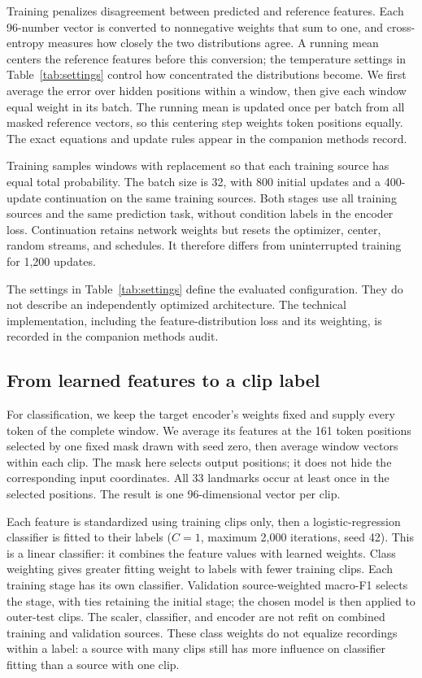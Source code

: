 \documentclass[10pt,twocolumn,letterpaper]{article}
\begin{document}
Training penalizes disagreement between predicted and reference features. Each 96-number vector is converted to nonnegative weights that sum to one, and cross-entropy measures how closely the two distributions agree. A running mean centers the reference features before this conversion; the temperature settings in Table~\ref{tab:settings} control how concentrated the distributions become. We first average the error over hidden positions within a window, then give each window equal weight in its batch. The running mean is updated once per batch from all masked reference vectors, so this centering step weights token positions equally. The exact equations and update rules appear in the companion methods record.

Training samples windows with replacement so that each training source has equal total probability. The batch size is 32, with 800 initial updates and a 400-update continuation on the same training sources. Both stages use all training sources and the same prediction task, without condition labels in the encoder loss. Continuation retains network weights but resets the optimizer, center, random streams, and schedules. It therefore differs from uninterrupted training for 1,200 updates.

The settings in Table~\ref{tab:settings} define the evaluated configuration. They do not describe an independently optimized architecture. The technical implementation, including the feature-distribution loss and its weighting, is recorded in the companion methods audit.

\subsection{From learned features to a clip label}
For classification, we keep the target encoder's weights fixed and supply every token of the complete window. We average its features at the 161 token positions selected by one fixed mask drawn with seed zero, then average window vectors within each clip. The mask here selects output positions; it does not hide the corresponding input coordinates. All 33 landmarks occur at least once in the selected positions. The result is one 96-dimensional vector per clip.

Each feature is standardized using training clips only, then a logistic-regression classifier is fitted to their labels ($C=1$, maximum 2,000 iterations, seed 42). This is a linear classifier: it combines the feature values with learned weights. Class weighting gives greater fitting weight to labels with fewer training clips. Each training stage has its own classifier. Validation source-weighted macro-F1 selects the stage, with ties retaining the initial stage; the chosen model is then applied to outer-test clips. The scaler, classifier, and encoder are not refit on combined training and validation sources. These class weights do not equalize recordings within a label: a source with many clips still has more influence on classifier fitting than a source with one clip.
\end{document}
